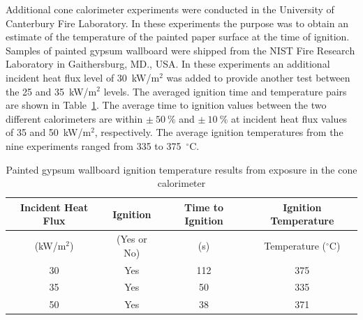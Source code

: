 \documentclass[twoside]{uocthesis}
\begin{document}
Additional cone calorimeter experiments were conducted in the University of Canterbury Fire Laboratory.  In these experiments the purpose was to obtain an estimate of the temperature of the painted paper surface at the time of ignition.   Samples of painted gypsum wallboard were shipped from the NIST Fire Research Laboratory in Gaithersburg, MD., USA.  In these experiments an additional incident heat flux level of 30~kW/m$^2$ was added to provide another test between the 25 and 35~kW/m$^2$ levels.  The averaged ignition time and temperature pairs are shown in Table~\ref{tab:Gypsum_wallboard_igntemp}.  The average time to ignition values between the two different calorimeters are within $\pm~50~\%$ and $\pm~10~\%$ at incident heat flux values of 35 and 50~kW/m$^2$, respectively.  The average ignition temperatures from the nine experiments ranged from 335 to 375~$^{\circ}$C.  
          

\begin{table}
	\centering
	\begin{tabular}{|c|c|c|c|}
		\hline Incident Heat Flux & Ignition & Time to Ignition & Ignition Temperature \\
		\hline (kW/m$^2$) & (Yes or No) & (s)  & Temperature ($^{\circ}$C)   \\ \hline
		\hline 30 	& Yes 	& 112	& 375 	 \\
		\hline 35	& Yes 	& 50 	& 335 	 \\
		\hline 50	& Yes 	& 38 	& 371 	 \\
		\hline
	\end{tabular}
	\caption[Painted gypsum wallboard ignition temperature results]{Painted gypsum wallboard ignition temperature results from exposure in the cone calorimeter}
	\label{tab:Gypsum_wallboard_igntemp}
\end{table}
\end{document}
